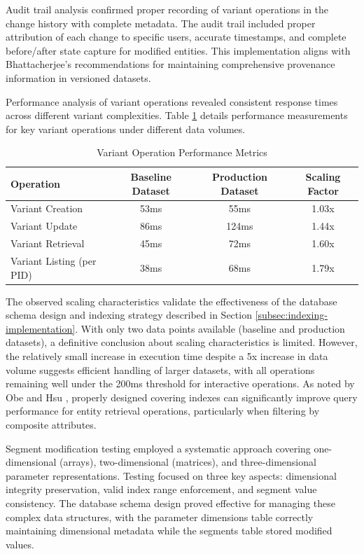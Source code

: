 Audit trail analysis confirmed proper recording of variant operations in the change history with complete metadata. The audit trail included proper attribution of each change to specific users, accurate timestamps, and complete before/after state capture for modified entities. This implementation aligns with Bhattacherjee's recommendations \cite{bhattacherjee2015principles} for maintaining comprehensive provenance information in versioned datasets.

Performance analysis of variant operations revealed consistent response times across different variant complexities. Table \ref{tab:variant-operation-performance} details performance measurements for key variant operations under different data volumes.

\begin{table}[h]
\centering
\caption{Variant Operation Performance Metrics}
\label{tab:variant-operation-performance}
\begin{tabular}{|l|c|c|c|}
\hline
\textbf{Operation} & \textbf{Baseline Dataset} & \textbf{Production Dataset} & \textbf{Scaling Factor} \\
\hline
Variant Creation & 53ms & 55ms & 1.03x \\
\hline
Variant Update & 86ms & 124ms & 1.44x \\
\hline
Variant Retrieval & 45ms & 72ms & 1.60x \\
\hline
Variant Listing (per PID) & 38ms & 68ms & 1.79x \\
\hline
\end{tabular}
\end{table}

The observed scaling characteristics validate the effectiveness of the database schema design and indexing strategy described in Section \ref{subsec:indexing-implementation}. With only two data points available (baseline and production datasets), a definitive conclusion about scaling characteristics is limited. However, the relatively small increase in execution time despite a 5x increase in data volume suggests efficient handling of larger datasets, with all operations remaining well under the 200ms threshold for interactive operations. As noted by Obe and Hsu \cite{obe2017postgresql}, properly designed covering indexes can significantly improve query performance for entity retrieval operations, particularly when filtering by composite attributes.

Segment modification testing employed a systematic approach covering one-dimensional (arrays), two-dimensional (matrices), and three-dimensional parameter representations. Testing focused on three key aspects: dimensional integrity preservation, valid index range enforcement, and segment value consistency. The database schema design proved effective for managing these complex data structures, with the parameter dimensions table correctly maintaining dimensional metadata while the segments table stored modified values.

